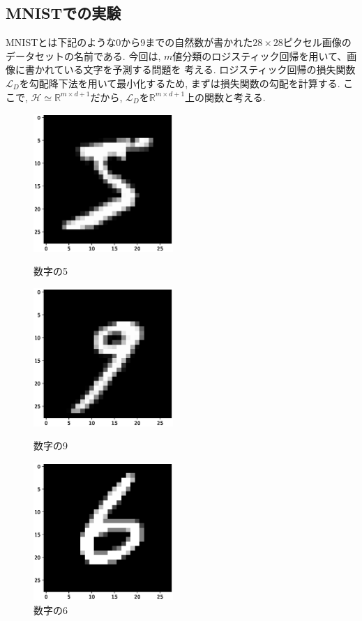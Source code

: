 \documentclass[11pt, a4paper, dvipdfmx]{jsarticle}
\theoremstyle{definition}
\newcommand{\R}{\mathbb{R}}
\newcommand{\Hil}{\mathcal{H}}
\newcommand{\Loss}{\mathcal{L}_{D}}
\begin{document}
\subsection{MNISTでの実験}
MNISTとは下記のような0から9までの自然数が書かれた$28\times28$ピクセル画像のデータセットの名前である. 
今回は, $m$値分類のロジスティック回帰を用いて、画像に書かれている文字を予測する問題を
考える. ロジスティック回帰の損失関数$\Loss$を勾配降下法を用いて最小化するため, まずは損失関数の勾配を計算する.
ここで, $\Hil\simeq\R^{m\times d + 1}$だから, $\Loss$を$\R^{m\times d + 1}$上の関数と考える.\
\begin{figure}[htbp]
    \begin{minipage}{0.32\hsize}
        \centering
        \includegraphics[width = 5.3cm]{Images/MNIST_sample1.eps}
        \caption{数字の5}
    \end{minipage}
    \begin{minipage}{0.32\hsize}
        \centering
        \includegraphics[width = 5.3cm]{Images/MNIST_sample2.eps}
        \caption{数字の9}
    \end{minipage}
    \begin{minipage}{0.32\hsize}
        \centering
        \includegraphics[width = 5.3cm]{Images/MNIST_sample3.eps}
        \caption{数字の6}
    \end{minipage}
\end{figure}
\end{document}
